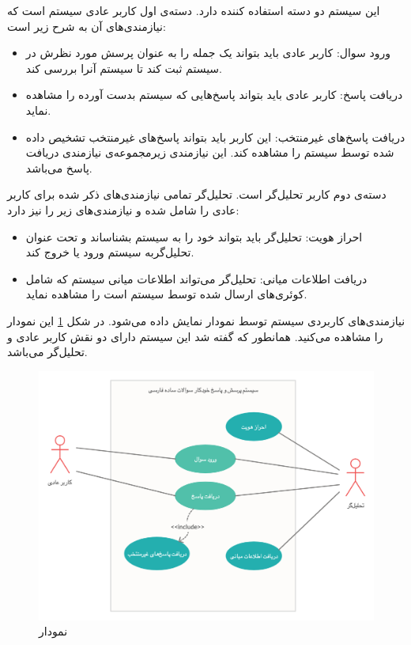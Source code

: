 این سیستم دو دسته استفاده کننده دارد.
دسته‌ی اول کاربر عادی سیستم است که نیازمندی‌های آن به شرح زیر است:

\begin{itemize}
	\item ورود سوال: کاربر عادی باید بتواند یک جمله را به عنوان پرسش مورد نظرش در سیستم ثبت کند تا سیستم آنرا بررسی کند.
	\item دریافت پاسخ: کاربر عادی باید بتواند پاسخ‌هایی که سیستم بدست آورده را مشاهده نماید.
	\item دریافت پاسخ‌های غیرمنتخب: این کاربر باید بتواند پاسخ‌های غیرمنتخب تشخیص داده شده توسط سیستم را مشاهده کند. این نیازمندی زیرمجموعه‌ی نیازمندی دریافت پاسخ می‌باشد. 
\end{itemize}
دسته‌ی دوم کاربر تحلیل‌گر است. تحلیل‌گر تمامی نیازمندی‌های ذکر شده برای کاربر عادی را شامل شده و نیازمندی‌های زیر را نیز دارد:

\begin{itemize}
	\item احراز هویت: تحلیل‌گر باید بتواند خود را به سیستم بشناساند و تحت عنوان تحلیل‌گربه سیستم ورود یا خروج کند. 
	\item دریافت اطلاعات میانی: تحلیل‌گر می‌تواند اطلاعات میانی سیستم که شامل کوئری‌های ارسال شده توسط سیستم است را مشاهده نماید.
\end{itemize}
نیازمندی‌های کاربردی سیستم توسط نمودار  نمایش داده می‌شود. در شکل \ref{fig:use_case} این نمودار را مشاهده می‌کنید. همانطور که گفته شد این سیستم دارای دو نقش کاربر عادی و تحلیل‌گر می‌باشد.

\begin{figure}[t!]
	\centering
	\includegraphics[width=15cm]{figures/se-diagrams/use-case.png}
	\caption[نمودار ]{نمودار }
	\label{fig:use_case}
\end{figure}

